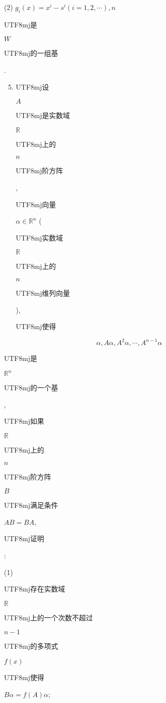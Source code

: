 \documentclass[10pt]{article}
\begin{document}
(2) $g_{i}(x)=x^{i}-s^{i}(i=1,2, \cdots), n$ \begin{CJK}{UTF8}{mj}是\end{CJK} $W$ \begin{CJK}{UTF8}{mj}的一组基\end{CJK}.

\begin{enumerate}
  \setcounter{enumi}{4}
  \item \begin{CJK}{UTF8}{mj}设\end{CJK} $A$ \begin{CJK}{UTF8}{mj}是实数域\end{CJK} $\mathbb{R}$ \begin{CJK}{UTF8}{mj}上的\end{CJK} $n$ \begin{CJK}{UTF8}{mj}阶方阵\end{CJK}, \begin{CJK}{UTF8}{mj}向量\end{CJK} $\alpha \in \mathbb{R}^{n}$ (\begin{CJK}{UTF8}{mj}实数域\end{CJK} $\mathbb{R}$ \begin{CJK}{UTF8}{mj}上的\end{CJK} $n$ \begin{CJK}{UTF8}{mj}维列向量\end{CJK}), \begin{CJK}{UTF8}{mj}使得\end{CJK}
\end{enumerate}
$$
\alpha, A \alpha, A^{2} \alpha, \cdots, A^{n-1} \alpha
$$
\begin{CJK}{UTF8}{mj}是\end{CJK} $\mathbb{R}^{n}$ \begin{CJK}{UTF8}{mj}的一个基\end{CJK}, \begin{CJK}{UTF8}{mj}如果\end{CJK} $\mathbb{R}$ \begin{CJK}{UTF8}{mj}上的\end{CJK} $n$ \begin{CJK}{UTF8}{mj}阶方阵\end{CJK} $B$ \begin{CJK}{UTF8}{mj}满足条件\end{CJK} $A B=B A$, \begin{CJK}{UTF8}{mj}证明\end{CJK}:

(1) \begin{CJK}{UTF8}{mj}存在实数域\end{CJK} $\mathbb{R}$ \begin{CJK}{UTF8}{mj}上的一个次数不超过\end{CJK} $n-1$ \begin{CJK}{UTF8}{mj}的多项式\end{CJK} $f(x)$ \begin{CJK}{UTF8}{mj}使得\end{CJK} $B \alpha=f(A) \alpha$;
\end{document}
